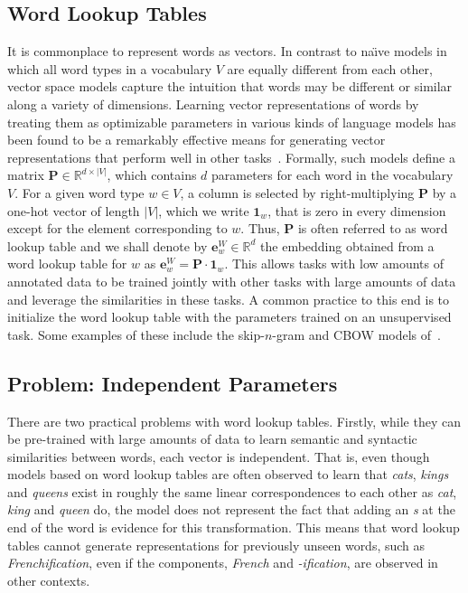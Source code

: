 \documentclass[11pt]{article}
\newcommand{\examp}[1]{\emph{#1}}
\begin{document}
\begin{CJK*}{UTF8}{gbsn}
{\subsection{Word Lookup Tables}}
It is commonplace to represent words as vectors. In contrast to na\"{\i}ve models in which all word types in a vocabulary $V$ are equally different from each other, vector space models capture the intuition that words may be different or similar along a variety of dimensions. Learning vector representations of words by treating them as optimizable parameters in various kinds of language models has been found to be a remarkably effective means for generating vector representations that perform well in other tasks~\cite{collobert2011natural,kalchbrenner2013recurrent,liu2014recursive,chen2014fast}. Formally, such models define a matrix $\mathbf{P} \in \mathbb{R}^{d \times |V|}$, which contains $d$ parameters for each word in the vocabulary $V$. For a given word type $w\in V$, a column is selected by right-multiplying $\mathbf{P}$ by a one-hot vector of length $|V|$, which we write $\mathbf{1}_w$, that is zero in every dimension except for the element corresponding to $w$. Thus, $\mathbf{P}$ is often referred to as word lookup table and we shall denote by $\mathbf{e}^W_w \in \mathbb{R}^d$ the embedding obtained from a word lookup table for $w$ as $\mathbf{e}^W_w = \mathbf{P}\cdot \mathbf{1}_w$. This allows tasks with low amounts of annotated data to be trained jointly with other tasks with large amounts of data and leverage the similarities in these tasks. A common practice to this end is to initialize the word lookup table with the parameters trained on an unsupervised task. Some examples of these include the skip-$n$-gram and CBOW models of~.

\subsection{Problem: Independent Parameters}
There are two practical problems with word lookup tables. Firstly, while they can be pre-trained with large amounts of data to learn semantic and syntactic similarities between words, each vector is independent. That is, even though models based on word lookup tables are often observed to learn that \examp{cats}, \examp{kings} and \examp{queens} exist in roughly the same linear correspondences to each other as \examp{cat}, \examp{king} and \examp{queen} do, the model does not represent the fact that adding an \examp{s} at the end of the word is evidence for this transformation. This means that word lookup tables cannot generate representations for previously unseen words, such as \examp{Frenchification}, even if the components, \examp{French} and \examp{-ification}, are observed in other contexts.


\end{CJK*}
\end{document}
